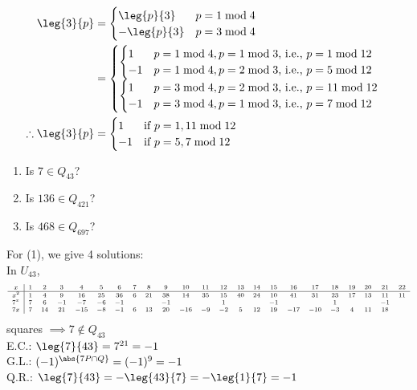\begin{align*}
\leg{3}{p} &= \begin{cases}
\leg{p}{3} & p=1\bmod4 \\
-\leg{p}{3} & p=3\bmod4
\end{cases} \\
&= \begin{cases}
\begin{cases}
1 & p=1\bmod4,p=1\bmod3\text{, i.e., }p=1\bmod12 \\
-1 & p=1\bmod4,p=2\bmod3\text{, i.e., }p=5\bmod12
\end{cases} \\
\begin{cases}
1 & p=3\bmod4,p=2\bmod3\text{, i.e., }p=11\bmod12 \\
-1 & p=3\bmod4,p=1\bmod3\text{, i.e., }p=7\bmod12
\end{cases}
\end{cases} \\
\therefore \leg{3}{p} &= \begin{cases}
1 & \text{if $p=1,11\bmod12$} \\
-1 & \text{if $p=5,7\bmod12$}
\end{cases}
\end{align*}
\eg\begin{enumerate}
\item Is $7\in Q_{43}$?
\item Is $136\in Q_{421}$?
\item Is $468\in Q_{697}$?
\end{enumerate}
For (1), we give 4 solutions: \\
In $U_{43}$,
\[ \scriptsize\begin{array}{c|cccccccccccccccccccccc}
x & 1 & 2 & 3 & 4 & 5 & 6 & 7 & 8 & 9 & 10 & 11 & 12 & 13 & 14 & 15 & 16 & 17 & 18 & 19 & 20 & 21 & 22 \\ \hline
x^2 & 1 & 4 & 9 & 16 & 25 & 36 & 6 & 21 & 38 & 14 & 35 & 15 & 40 & 24 & 10 & 41 & 31 & 23 & 17 & 13 & 11 & 11 \\
7^x & 7 & 6 & -1 & -7 & -6 & -1 & & & -1 & & & 1 & & & -1 & & & 1 & & & -1 & \\
7x & 7 & 14 & 21 & -15 & -8 & -1 & 6 & 13 & 20 & -16 & -9 & -2 & 5 & 12 & 19 & -17 & -10 & -3 & 4 & 11 & 18 & 
\end{array} \]
squares $\implies7\notin Q_{43}$ \\
E.C.: $\leg{7}{43}=7^{21}=-1$ \\
G.L.: $(-1)^{\abs{7P\cap Q}}=(-1)^9=-1$ \\
Q.R.: $\leg{7}{43}=-\leg{43}{7}=-\leg{1}{7}=-1$
